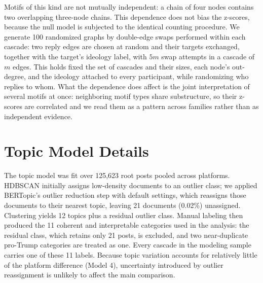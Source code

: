 \documentclass[letterpaper]{article} %
\newcommand{\rev}[1]{{\color{blue}#1}}
\begin{document}
\rev{Motifs of this kind are not mutually independent: a chain of four nodes contains two overlapping three-node chains. This dependence does not bias the z-scores, because the null model is subjected to the identical counting procedure. We generate 100 randomized graphs by double-edge swaps performed within each cascade: two reply edges are chosen at random and their targets exchanged, together with the target's ideology label, with $5m$ swap attempts in a cascade of $m$ edges. This holds fixed the set of cascades and their sizes, each node's out-degree, and the ideology attached to every participant, while randomizing who replies to whom. What the dependence does affect is the joint interpretation of several motifs at once: neighboring motif types share substructure, so their z-scores are correlated and we read them as a pattern across families rather than as independent evidence.}

\section{\rev{Topic Model Details}}

\rev{The topic model was fit over 125,623 root posts pooled across platforms. HDBSCAN initially assigns low-density documents to an outlier class; we applied BERTopic's outlier reduction step with default settings, which reassigns those documents to their nearest topic, leaving 21 documents (0.02\%) unassigned. Clustering yields 12 topics plus a residual outlier class. Manual labeling then produced the 11 coherent and interpretable categories used in the analysis: the residual class, which retains only 21 posts, is excluded, and two near-duplicate pro-Trump categories are treated as one. Every cascade in the modeling sample carries one of these 11 labels. Because topic variation accounts for relatively little of the platform difference (Model 4), uncertainty introduced by outlier reassignment is unlikely to affect the main comparison.}
\end{document}
